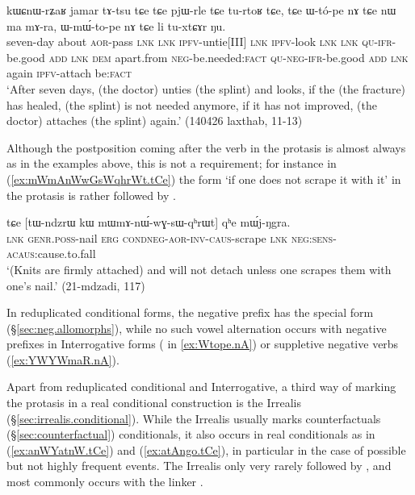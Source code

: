 \begin{exe}
\ex \label{ex:Wtope.nA}
 \gll   kɯɕnɯ-rʑaʁ jamar tɤ-tsu tɕe tɕe pjɯ-rle tɕe tu-rtoʁ tɕe, tɕe ɯ-tó-pe nɤ tɕe nɯ ma mɤ-ra,
ɯ-mɯ́-to-pe nɤ tɕe li tu-xtɕɤr ŋu. \\
seven-day about \textsc{aor}-pass \textsc{lnk} \textsc{lnk} \textsc{ipfv}-untie[III] \textsc{lnk} \textsc{ipfv}-look \textsc{lnk} \textsc{lnk} \textsc{qu}-\textsc{ifr}-be.good \textsc{add} \textsc{lnk} \textsc{dem} apart.from \textsc{neg}-be.needed:\textsc{fact} \textsc{qu}-\textsc{neg}-\textsc{ifr}-be.good \textsc{add} \textsc{lnk} again \textsc{ipfv}-attach be:\textsc{fact} \\
\glt `After seven days, (the doctor) unties (the splint) and looks, if the (the fracture) has healed, (the splint) is not needed anymore, if it has not improved, (the doctor) attaches (the splint) again.' (140426 laxthab, 11-13)
\end{exe}
 
Although the postposition coming after the verb in the protasis is almost always  as in the examples above, this is not a requirement; for instance in (\ref{ex:mWmAnWwGsWqhrWt.tCe}) the form  `if one does not scrape it with it' in the protasis is rather followed by .

 \begin{exe}
\ex \label{ex:mWmAnWwGsWqhrWt.tCe}
 \gll tɕe [tɯ-ndzrɯ kɯ mɯ\redp{}mɤ-nɯ́-wɣ-sɯ-qʰrɯt] qʰe mɯ́j-ŋgra. \\
 \textsc{lnk} \textsc{genr}.\textsc{poss}-nail \textsc{erg} \textsc{cond}\redp{}\textsc{neg}-\textsc{aor}-\textsc{inv}-\textsc{caus}-scrape \textsc{lnk} \textsc{neg}:\textsc{sens}-\textsc{acaus}:cause.to.fall \\
 \glt `(Knits are firmly attached) and will not detach unless one scrapes them with one's nail.' (21-mdzadi, 117)
 \end{exe}

In reduplicated conditional forms, the negative prefix  has the special form  (§\ref{sec:neg.allomorphs}), while no such vowel alternation occurs with negative prefixes in Interrogative forms ( in \ref{ex:Wtope.nA}) or suppletive negative verbs (\ref{ex:YWYWmaR.nA}).

Apart from reduplicated conditional and Interrogative, a third way of marking the protasis in a real conditional construction is the Irrealis (§\ref{sec:irrealis.conditional}). While the Irrealis usually marks counterfactuals (§\ref{sec:counterfactual}) conditionals, it also occurs in real conditionals as in (\ref{ex:anWYatnW.tCe}) and (\ref{ex:atAngo.tCe}), in particular in the case of possible but not highly frequent events. The Irrealis only very rarely followed by , and most commonly occurs with the linker .

